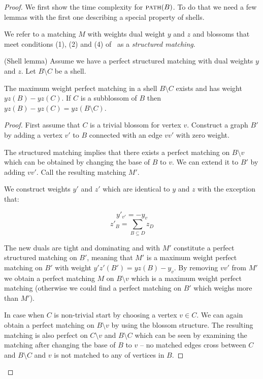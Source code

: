 \begin{proof}

    We first show the time complexity for $\textsc{path}(B)$. To do that we need a few lemmas with the first one describing a special property of shells.

    We refer to a matching $M$ with weights dual weight $y$ and $z$ and blossoms that meet conditions (1), (2) and (4) of~ as a \emph{structured matching}.

\begin{lemma}{(Shell lemma)}\label{lem:shell}
    Assume we have a perfect structured matching with dual weights $y$ and $z$. Let $B \setminus C$ be a shell.

    The maximum weight perfect matching in a shell $B \setminus C$ exists and has weight $yz(B) - yz(C)$. If $C$ is a subblossom of $B$ then $yz(B) - yz(C) = yz(B \setminus C)$. 
\end{lemma}

\begin{proof}
    First assume that $C$ is a trivial blossom for vertex $v$. Construct a graph $B'$ by adding a vertex $v'$ to $B$ connected with an edge $vv'$ with zero weight. 
    
    The structured matching implies that there exists a perfect matching on $B \setminus v$ which can be obtained by changing the base of $B$ to $v$. We can extend it to $B'$ by adding $vv'$. Call the resulting matching $M'$.

    We construct weights $y'$ and $z'$ which are identical to $y$ and $z$ with the exception that:

    \[y'_{v'} = -y_v \]
    \[z'_B = \sum_{B \subseteq D} z_D \]

    The new duals are tight and dominating and with $M'$ constitute a perfect structured matching on $B'$, meaning that $M'$ is a maximum weight perfect matching on $B'$ with weight $y'z'(B') = yz(B) - y_v$. By removing $vv'$ from $M'$ we obtain a perfect matching $M$ on $B \setminus v$ which is a maximum weight perfect matching (otherwise we could find a perfect matching on $B'$ which weighs more than $M'$).

    In case when $C$ is non-trivial start by choosing a vertex $v \in C$. We can again obtain a perfect matching on $B \setminus v$ by using the blossom structure. The resulting matching is also perfect on $C \setminus v$ and $B \setminus C$ which can be seen by examining the matching after changing the base of $B$ to $v$ – no matched edges cross between $C$ and $B \setminus C$ and $v$ is not matched to any of vertices in $B$.


\end{proof}
\end{proof}
